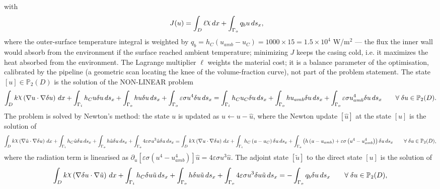\documentclass[preview]{standalone}
\let\oldcdot\cdot
\let\cdot\oldcdot
\begin{document}
with
\begin{align*}
J(u) &=  \int_{D} \ell \raisebox{\depth}{$\chi$} \,dx + \int_{\Gamma_o} q_b u \,ds_x ,
 \end{align*}
where the outer-surface temperature integral is weighted by $q_b = h_C \left( u_{amb} - u_{C}\right) = 1000 \times 15 = 1.5 \times 10^{4}$ W/m$^{2}$ — the flux the inner wall would absorb from the environment if the surface reached ambient temperature; minimizing $J$ keeps the casing cold, i.e. it maximizes the heat absorbed from the environment.  The Lagrange multiplier $\ell$ weights the material cost; it is a balance parameter of the optimisation, calibrated by the pipeline (a geometric scan locating the knee of the volume-fraction curve), not part of the problem statement.
The state $\left[ u\right] \in \mathbb P_{2}(D)$ is the solution of the NON-LINEAR problem
\begin{dmath*}
\int_{D} k \raisebox{\depth}{$\chi$} \left(  \nabla u  \cdot  \nabla \delta u  \right) \,dx + \int_{\Gamma_i} h_C u \delta u \,ds_x + \int_{\Gamma_o} h u \delta u \,ds_x + \int_{\Gamma_o} \varepsilon \sigma u^{4} \delta u \,ds_x = \int_{\Gamma_i} h_C u_{C} \delta u \,ds_x + \int_{\Gamma_o} h u_{amb} \delta u \,ds_x + \int_{\Gamma_o} \varepsilon \sigma u_{amb}^{4} \delta u \,ds_x \qquad \forall\; {\delta u\in \mathbb P_{2}(D)} .
\end{dmath*}
The problem is solved by Newton's method: the state $u$ is updated as $u \leftarrow u - \hat u$, where the Newton update $\left[ \hat u\right]$ at the state $\left[ u\right]$ is the solution of
\begin{dmath*}
\int_{D} k \raisebox{\depth}{$\chi$} \left(  \nabla \hat u  \cdot  \nabla \delta u  \right) \,dx + \int_{\Gamma_i} h_C \hat u \delta u \,ds_x + \int_{\Gamma_o} h \hat u \delta u \,ds_x + \int_{\Gamma_o} 4 \varepsilon \sigma u^{3} \hat u \delta u \,ds_x = \int_{D} k \raisebox{\depth}{$\chi$} \left(  \nabla u  \cdot  \nabla \delta u  \right) \,dx + \int_{\Gamma_i} h_C \left( u - u_C\right) \delta u \,ds_x + \int_{\Gamma_o} \left( h \left( u - u_{amb}\right) + \varepsilon \sigma \left( u^{4} - u_{amb}^{4}\right)\right) \delta u \,ds_x \qquad \forall\; {\delta u\in \mathbb P_{2}(D)} ,
\end{dmath*}
where the radiation term is linearised as $\partial_{u} \left[ \varepsilon \sigma \left( u^{4} - u_{amb}^{4}\right)\right] \hat u = 4 \varepsilon \sigma u^{3} \hat u$.
The adjoint state $\left[ \tilde u\right]$ to the direct state $\left[ u\right]$ is the solution of
\begin{dmath*}
\int_{D} k \raisebox{\depth}{$\chi$} \left(  \nabla \delta u  \cdot  \nabla \tilde u  \right) \,dx + \int_{\Gamma_i} h_C \delta u \tilde u \,ds_x + \int_{\Gamma_o} h \delta u \tilde u \,ds_x + \int_{\Gamma_o} 4 \varepsilon \sigma u^{3} \delta u \tilde u \,ds_x = - \int_{\Gamma_o} q_b \delta u \,ds_x \qquad \forall\; {\delta u\in \mathbb P_{2}(D)} ,
\end{dmath*}
\end{document}
